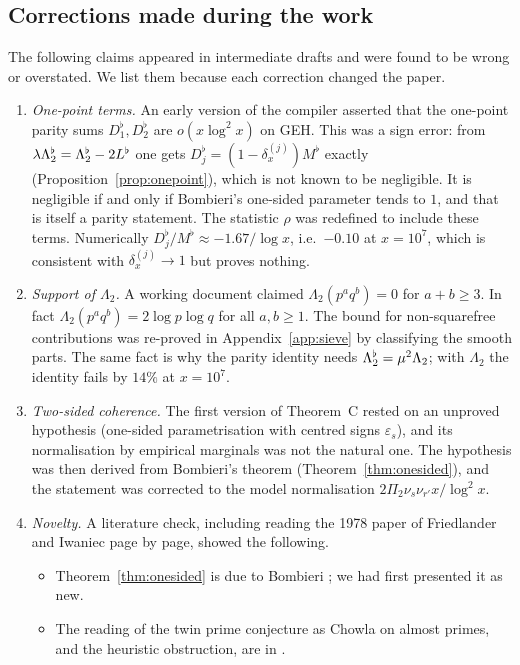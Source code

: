 \subsection{Corrections made during the work}
The following claims appeared in intermediate drafts and were found to be wrong or overstated. We list them because each correction changed the paper.
\begin{enumerate}
\item \emph{One-point terms.} An early version of the compiler asserted that the one-point parity sums $D_1^\flat,D_2^\flat$ are $o(x\log^2x)$ on GEH. This was a sign error: from $\lambda\Lambda_2^{\flat}=\Lambda_2^{\flat}-2L^\flat$ one gets $D_j^\flat=(1-\delta^{(j)}_x)M^\flat$ exactly (Proposition~\ref{prop:onepoint}), which is not known to be negligible. It is negligible if and only if Bombieri's one-sided parameter tends to $1$, and that is itself a parity statement. The statistic $\rho$ was redefined to include these terms. Numerically $D_j^\flat/M^\flat\approx-1.67/\log x$, i.e.\ $-0.10$ at $x=10^7$, which is consistent with $\delta^{(j)}_x\to1$ but proves nothing.
\item \emph{Support of $\Lambda_2$.} A working document claimed $\Lambda_2(p^aq^b)=0$ for $a+b\ge3$. In fact $\Lambda_2(p^aq^b)=2\log p\log q$ for all $a,b\ge1$. The bound for non-squarefree contributions was re-proved in Appendix~\ref{app:sieve} by classifying the smooth parts. The same fact is why the parity identity needs $\Lambda_2^{\flat}=\mu^2\Lambda_2$; with $\Lambda_2$ the identity fails by $14\%$ at $x=10^7$.
\item \emph{Two-sided coherence.} The first version of Theorem~C rested on an unproved hypothesis (one-sided parametrisation with centred signs $\varepsilon_s$), and its normalisation by empirical marginals was not the natural one. The hypothesis was then derived from Bombieri's theorem (Theorem~\ref{thm:onesided}), and the statement was corrected to the model normalisation $2\Pi_2\nu_s\nu_{r'}x/\log^2x$.
\item \emph{Novelty.} A literature check, including reading the 1978 paper of Friedlander and Iwaniec page by page, showed the following.
\begin{itemize}
\item Theorem~\ref{thm:onesided} is due to Bombieri \cite[Remark~I.4]{FI78}; we had first presented it as new.
\item The reading of the twin prime conjecture as Chowla on almost primes, and the heuristic obstruction, are in \cite{Tao16notes}.
\end{itemize}

\end{enumerate}

